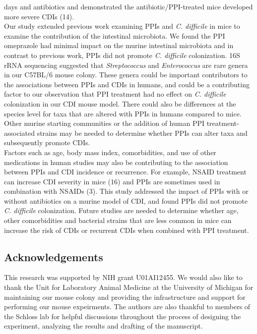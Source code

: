 \documentclass[11pt,]{article}
\begin{document}
days and antibiotics and demonstrated the antibiotic/PPI-treated mice
developed more severe CDIs (14).\\
Our study extended previous work examining PPIs and \emph{C. difficile}
in mice to examine the contribution of the intestinal microbiota. We
found the PPI omeprazole had minimal impact on the murine intestinal
microbiota and in contrast to previous work, PPIs did not promote
\emph{C. difficile} colonization. 16S rRNA sequencing suggested that
\emph{Streptococcus} and \emph{Enterococcus} are rare genera in our
C57BL/6 mouse colony. These genera could be important contributors to
the associations between PPIs and CDIs in humans, and could be a
contributing factor to our observation that PPI treatment had no effect
on \emph{C. difficile} colonization in our CDI mouse model. There could
also be differences at the species level for taxa that are altered with
PPIs in humans compared to mice. Other murine starting communities or
the addition of human PPI treatment-associated strains may be needed to
determine whether PPIs can alter taxa and subsequently promote CDIs.\\
Factors such as age, body mass index, comorbidities, and use of other
medications in human studies may also be contributing to the association
between PPIs and CDI incidence or recurrence. For example, NSAID
treatment can increase CDI severity in mice (16) and PPIs are sometimes
used in combination with NSAIDs (3). This study addressed the impact of
PPIs with or without antibiotics on a murine model of CDI, and found
PPIs did not promote \emph{C. difficile} colonization. Future studies
are needed to determine whether age, other comorbidities and bacterial
strains that are less common in mice can increase the risk of CDIs or
recurrent CDIs when combined with PPI treatment.

\subsection{Acknowledgements}\label{acknowledgements}

This research was supported by NIH grant U01AI12455. We would also like
to thank the Unit for Laboratory Animal Medicine at the University of
Michigan for maintaining our mouse colony and providing the
infrastructure and support for performing our mouse expeirments. The
authors are also thankful to members of the Schloss lab for helpful
discussions throughout the process of designing the experiment,
analyzing the results and drafting of the manuscript.
\end{document}
